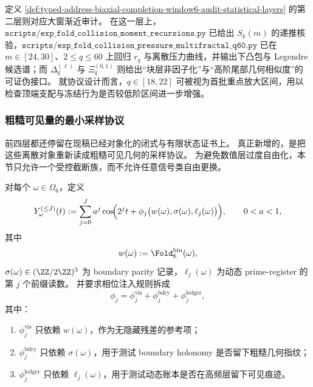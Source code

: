 定义 \ref{def:typed-address-biaxial-completion-window6-audit-statistical-layers} 的第二层则对应大窗渐近审计。
在这一层上，\(\texttt{scripts/exp\_fold\_collision\_moment\_recursions.py}\) 已给出 \(S_k(m)\) 的递推核验，\(\texttt{scripts/exp\_fold\_collision\_pressure\_multifractal\_q60.py}\) 已在 \(m\in[24,30]\)、\(2\le q\le 60\) 上回归 \(r_q\) 与离散压力曲线，并输出下凸包与 Legendre 候选谱；而 \(\Delta_q^{(\ell)}\) 与 \(\Xi_q^{(0,1)}\) 则给出“块层非因子化”与“高阶尾部几何相似度”的可证伪接口。
就协议设计而言，\(q\in[18,22]\) 可被视为首批重点放大区间，用以检查顶端支配与冻结行为是否较低阶区间进一步增强。

\subsubsection{粗糙可见量的最小采样协议}\label{subsubsec:typed-address-biaxial-completion-window6-numerical-audit-rough-visibility-sampling}
前四层都还停留在现稿已经对象化的闭式与有限状态证书上。
真正新增的，是把这些离散对象重新读成粗糙可见几何的采样协议。
为避免数值层过度自由化，本节只允许一个受控截断族，而不允许任意信号类自由更换。

\begin{definition}\label{def:typed-address-biaxial-completion-window6-audit-rough-sampling}
对每个 \(\omega\in\Omega_6\)，定义
\[
Y_\omega^{(\le J)}(t)
:=
\sum_{j=0}^{J} a^j
\cos\!\Bigl(
2^j t+\phi_j\bigl(w(\omega),\sigma(\omega),\ell_j(\omega)\bigr)
\Bigr),
\qquad 0<a<1,
\]
其中
\[
w(\omega):=\Fold_6^{\mathrm{bin}}(\omega),
\]
\(\sigma(\omega)\in(\ZZ/2\ZZ)^3\) 为 boundary parity 记录，\(\ell_j(\omega)\) 为动态 prime-register 的第 \(j\) 个前缀读数。
并要求相位注入规则拆成
\[
\phi_j=\phi_j^{\mathrm{vis}}+\phi_j^{\mathrm{bdry}}+\phi_j^{\mathrm{ledger}},
\]
其中：
\begin{enumerate}
  \item \(\phi_j^{\mathrm{vis}}\) 只依赖 \(w(\omega)\)，作为无隐藏残差的参考项；
  \item \(\phi_j^{\mathrm{bdry}}\) 只依赖 \(\sigma(\omega)\)，用于测试 boundary holonomy 是否留下粗糙几何指纹；
  \item \(\phi_j^{\mathrm{ledger}}\) 只依赖 \(\ell_j(\omega)\)，用于测试动态账本是否在高频层留下可见痕迹。
\end{enumerate}
\end{definition}

